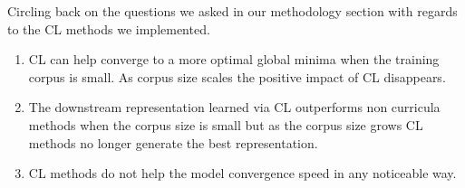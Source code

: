 Circling back on the questions we asked in our methodology section with regards to the CL methods we implemented. 
\begin{enumerate}
\item CL can help converge to a more optimal global minima when the training corpus is small. As corpus size scales the positive impact of CL disappears.
\item The downstream representation learned via CL outperforms non curricula methods when the corpus size is small but as the corpus size grows CL methods no longer generate the best representation.
\item CL methods do not help the model convergence speed in any noticeable way.
\end{enumerate}